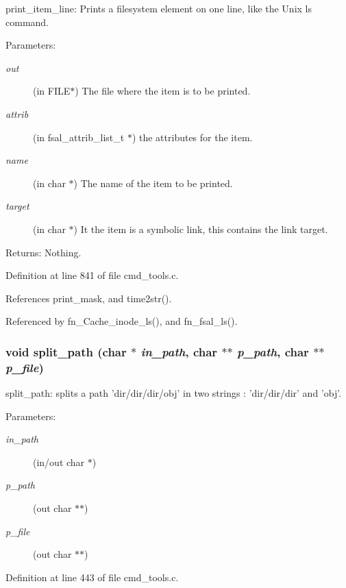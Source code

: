 print\_\-item\_\-line: Prints a filesystem element on one line, like the Unix ls command.

\begin{Desc}
\item[Parameters:]
\begin{description}
\item[{\em out}](in FILE$\ast$) The file where the item is to be printed. \item[{\em attrib}](in fsal\_\-attrib\_\-list\_\-t $\ast$) the attributes for the item. \item[{\em name}](in char $\ast$) The name of the item to be printed. \item[{\em target}](in char $\ast$) It the item is a symbolic link, this contains the link target. \end{description}
\end{Desc}
\begin{Desc}
\item[Returns:]Nothing. \end{Desc}


Definition at line 841 of file cmd\_\-tools.c.

References print\_\-mask, and time2str().

Referenced by fn\_\-Cache\_\-inode\_\-ls(), and fn\_\-fsal\_\-ls().
\subsubsection{\setlength{\rightskip}{0pt plus 5cm}void split\_\-path (char $\ast$ {\em in\_\-path}, char $\ast$$\ast$ {\em p\_\-path}, char $\ast$$\ast$ {\em p\_\-file})}\label{cmd__tools_8h_a15}


split\_\-path: splits a path 'dir/dir/dir/obj' in two strings : 'dir/dir/dir' and 'obj'.

\begin{Desc}
\item[Parameters:]
\begin{description}
\item[{\em in\_\-path}](in/out char $\ast$) \item[{\em p\_\-path}](out char $\ast$$\ast$) \item[{\em p\_\-file}](out char $\ast$$\ast$) \end{description}
\end{Desc}


Definition at line 443 of file cmd\_\-tools.c.

